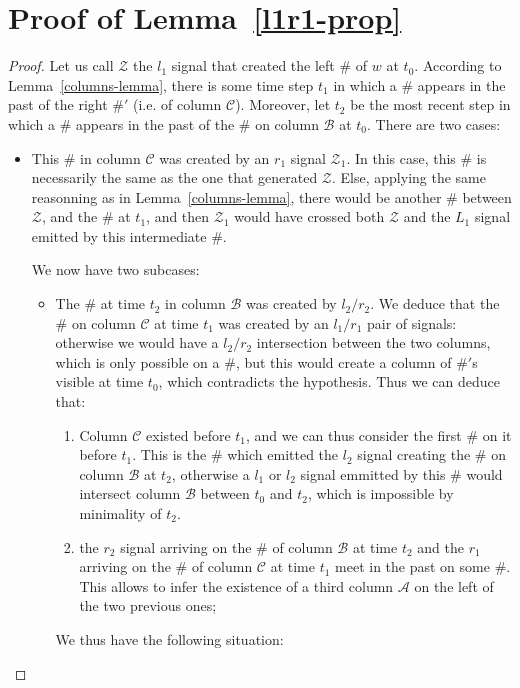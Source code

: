 \documentclass{jac}
\theoremstyle{definition}
\begin{document}
\section{Proof of Lemma~\ref{l1r1-prop}}
  \begin{proof}
    Let us call $\mathcal Z$ the $l_1$ signal that created the left $\#$ of $w$ at $t_0$. 
    According to Lemma~\ref{columns-lemma}, there is some time step $t_1$
    in which a $\#$ appears in the past of the right $\#'$ (i.e. of column $\mathcal C$).
    Moreover, let $t_2$ be the most recent step in which a $\#$ appears in the past of
    the $\#$ on column $\mathcal B$ at $t_0$.
    There are two cases:
    \begin{itemize}
    \item This $\#$ in column $\mathcal C$ 
      was created by an $r_1$ signal ${\mathcal Z}_1$. In this case,
      this $\#$ is necessarily the same as the one that generated $\mathcal Z$. Else,
      applying the same reasonning as in Lemma~\ref{columns-lemma}, there would be another
      $\#$ between $\mathcal Z$, and the $\#$ at $t_1$, and then
      ${\mathcal Z}_1$ would have crossed
      both $\mathcal Z$ and the $L_1$ signal emitted by this intermediate $\#$.



      


      We now have two subcases:
      \begin{itemize}
      \item The $\#$ at time $t_2$ in column $\mathcal B$ was created by
        $l_2/r_2$. We deduce that the $\#$ on column $\mathcal C$ at time $t_1$ was
        created by an $l_1/r_1$ pair of signals: otherwise we would have a
        $l_2/r_2$ intersection between the two columns,
        which is only possible on a $\#$,
        but this would create a column of $\#'$s visible at time $t_0$, which
        contradicts the hypothesis. Thus we can deduce that:
        \begin{enumerate}
        \item Column $\mathcal C$ existed before $t_1$, and we can thus consider the
          first $\#$ on it before $t_1$. This is the $\#$ which emitted the $l_2$ signal
          creating the $\#$ on column $\mathcal B$ at $t_2$, otherwise a $l_1$ or $l_2$
          signal emmitted by this $\#$ would
          intersect column $\mathcal B$ between $t_0$ and $t_2$, which is
          impossible by minimality of $t_2$.
        \item the $r_2$ signal arriving on the $\#$ of column $\mathcal B$ at time
          $t_2$ and the $r_1$ arriving on the $\#$ of column $\mathcal C$ at time
          $t_1$ meet in the past on some $\#$. This allows to infer the existence of
          a third column $\mathcal A$ on the left of the two previous ones;
        \end{enumerate}
        We thus have the following situation:
\begin{center}
\end{center}
\end{itemize}
\end{itemize}
\end{proof}
\end{document}
